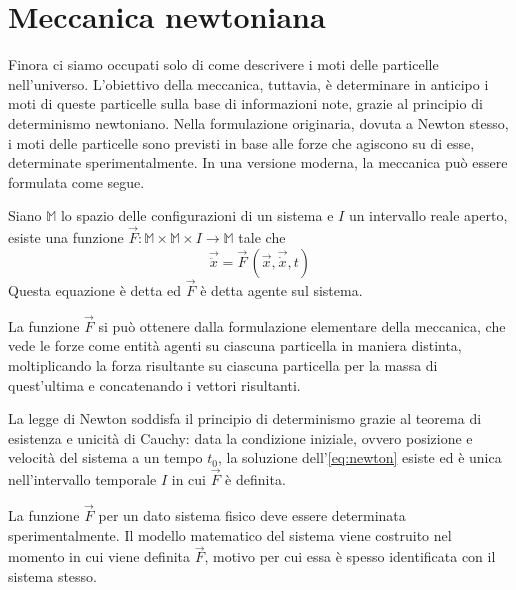 \section{Meccanica newtoniana}
Finora ci siamo occupati solo di come descrivere i moti delle particelle nell'universo. L'obiettivo della meccanica, tuttavia, è determinare in anticipo i moti di queste particelle sulla base di informazioni note, grazie al principio di determinismo newtoniano. Nella formulazione originaria, dovuta a Newton stesso, i moti delle particelle sono previsti in base alle forze che agiscono su di esse, determinate sperimentalmente. In una versione moderna, la meccanica può essere formulata come segue.
\begin{newton}
  Siano $\mathbb{M}$ lo spazio delle configurazioni di un sistema e $I$ un intervallo reale aperto, esiste una funzione $\vec{F}:\mathbb{M} \times \mathbb{M} \times  I \to \mathbb{M}$ tale che \begin{equation}
  \vec{\ddot{x}} = \vec{F}\,(\vec{x},\vec{\dot{x}}, t) \label{eq:newton}
  \end{equation} 
  Questa equazione è detta  ed $\vec{F}$ è detta  agente sul sistema.
\end{newton}
\begin{remark}
  La funzione $\vec{F}$ si può ottenere dalla formulazione elementare della meccanica, che vede le forze come entità agenti su ciascuna particella in maniera distinta, moltiplicando la forza risultante su ciascuna particella per la massa di quest'ultima e concatenando i vettori risultanti.
\end{remark}
\begin{remark}
  La legge di Newton soddisfa il principio di determinismo grazie al teorema di esistenza e unicità di Cauchy: data la condizione iniziale, ovvero posizione e velocità del sistema a un tempo $t_0$, la soluzione dell'\autoref{eq:newton} esiste ed è unica nell'intervallo temporale $I$ in cui $\vec{F}$ è definita.
\end{remark}
La funzione $\vec{F}$ per un dato sistema fisico deve essere determinata sperimentalmente. Il modello matematico del sistema viene costruito nel momento in cui viene definita $\vec{F}$, motivo per cui essa è spesso identificata con il sistema stesso.

